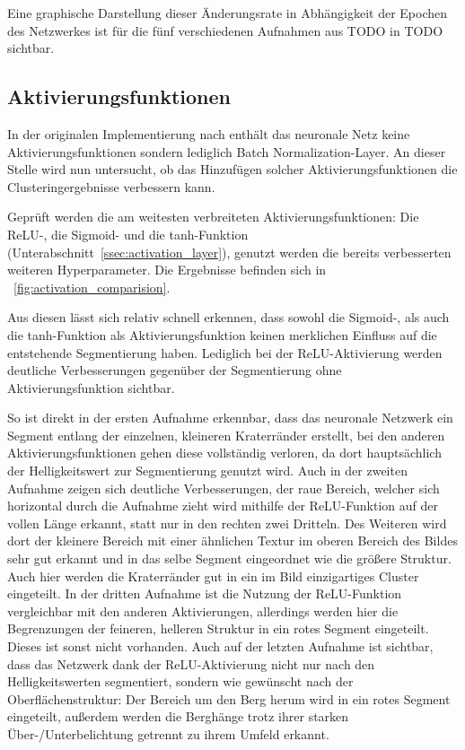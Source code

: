 Eine graphische Darstellung dieser Änderungsrate in Abhängigkeit der Epochen des Netzwerkes ist für die fünf verschiedenen Aufnahmen aus TODO in TODO sichtbar.
\fi

\subsection{Aktivierungsfunktionen}
\label{ssec:network_architecture_activation}

In der originalen Implementierung nach \cite{kanezaki_18} enthält das neuronale Netz keine Aktivierungsfunktionen sondern lediglich Batch Normalization-Layer. An dieser Stelle wird nun untersucht, ob das Hinzufügen solcher Aktivierungsfunktionen die Clusteringergebnisse verbessern kann.

Geprüft werden die am weitesten verbreiteten Aktivierungsfunktionen: Die ReLU-, die Sigmoid- und die tanh-Funktion (\vgl Unterabschnitt~\ref{ssec:activation_layer}), genutzt werden die bereits verbesserten weiteren Hyperparameter. Die Ergebnisse befinden sich in \figurename~\ref{fig:activation_comparision}.

Aus diesen lässt sich relativ schnell erkennen, dass sowohl die Sigmoid-, als auch die tanh-Funktion als Aktivierungsfunktion keinen merklichen Einfluss auf die entstehende Segmentierung haben. Lediglich bei der ReLU-Aktivierung werden deutliche Verbesserungen gegenüber der Segmentierung ohne Aktivierungsfunktion sichtbar.

So ist direkt in der ersten Aufnahme erkennbar, dass das neuronale Netzwerk ein Segment entlang der einzelnen, kleineren Kraterränder erstellt, bei den anderen Aktivierungsfunktionen gehen diese vollständig verloren, da dort hauptsächlich der Helligkeitswert zur Segmentierung genutzt wird. Auch in der zweiten Aufnahme zeigen sich deutliche Verbesserungen, der raue Bereich, welcher sich horizontal durch die Aufnahme zieht wird mithilfe der ReLU-Funktion auf der vollen Länge erkannt, statt nur in den rechten zwei Dritteln. Des Weiteren wird dort der kleinere Bereich mit einer ähnlichen Textur im oberen Bereich des Bildes sehr gut erkannt und in das selbe Segment eingeordnet wie die größere Struktur. Auch hier werden die Kraterränder gut in ein im Bild einzigartiges Cluster eingeteilt. In der dritten Aufnahme ist die Nutzung der ReLU-Funktion vergleichbar mit den anderen Aktivierungen, allerdings werden hier die Begrenzungen der feineren, helleren Struktur in ein rotes Segment eingeteilt. Dieses ist sonst nicht vorhanden. Auch auf der letzten Aufnahme ist sichtbar, dass das Netzwerk dank der ReLU-Aktivierung nicht nur nach den Helligkeitswerten segmentiert, sondern wie gewünscht nach der Oberflächenstruktur: Der Bereich um den Berg herum wird in ein rotes Segment eingeteilt, außerdem werden die Berghänge trotz ihrer starken Über-/Unterbelichtung getrennt zu ihrem Umfeld erkannt.

